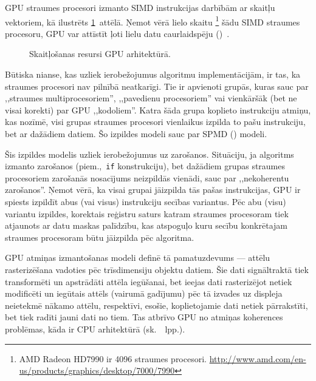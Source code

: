 GPU straumes procesori izmanto SIMD instrukcijas darbībām ar skaitļu
vektoriem, kā ilustrēts \ref{fig:gpu-arch}~attēlā. Ņemot vērā lielo skaitu%
\footnote{AMD Radeon HD7990 ir 4096 straumes procesori.
	\url{http://www.amd.com/en-us/products/graphics/desktop/7000/7990}}
šādu SIMD straumes procesoru, GPU var attīstīt ļoti lielu datu caurlaidspēju
()~\cite{Fatahalian}\cite{Owens-GPU}.

\begin{figure}[tbh]
	\centering
	\def\svgscale{1.2}
	{}
	\caption{Skaitļošanas resursi GPU arhitektūrā.}
	\label{fig:gpu-arch}
\end{figure}

Būtiska nianse, kas uzliek ierobežojumus algoritmu implementācijām, ir tas,
ka straumes procesori nav pilnībā neatkarīgi. Tie ir apvienoti grupās, kuras
sauc par ,,straumes multiprocesoriem'', ,,pavedienu procesoriem'' vai
vienkāršāk (bet ne visai korekti) par GPU ,,kodoliem''. Katra šāda grupa
koplieto instrukciju atmiņu, kas nozīmē, visi grupas straumes
procesori vienlaikus izpilda to pašu instrukciju, bet ar dažādiem datiem.
Šo izpildes modeli sauc par SPMD ()
modeli.

Šis izpildes modelis uzliek ierobežojumus uz zarošanos.
Situāciju, ja algoritms izmanto
zarošanos (piem.,~\texttt{if} konstrukciju),
bet dažādiem grupas straumes procesoriem zarošanās nosacījums neizpildās
vienādi, sauc par ,,nekoherentu zarošanos''. Ņemot vērā, ka visai grupai
jāizpilda tās pašas instrukcijas, GPU ir spiests izpildīt
abus (vai visus) instrukciju secības variantus. Pēc abu (visu) variantu
izpildes, korektais reģistru saturs katram straumes procesoram tiek
atjaunots ar datu maskas palīdzību, kas atspoguļo kuru secību
konkrētajam straumes procesoram būtu jāizpilda pēc algoritma.
\cite{Owens-GPU}



GPU atmiņas izmantošanas modeli definē tā pamatuzdevums --- 
attēlu rasterizēšana vadoties pēc trīsdimensiju objektu datiem.
Šie dati signāltraktā tiek transformēti un apstrādāti attēla iegūšanai,
bet ieejas dati rasterizējot netiek modificēti
un iegūtais attēls (vairumā gadījumu) pēc tā izvades uz displeja neietekmē
nākamo attēlu, respektīvi, esošie, koplietojamie dati netiek pārrakstīti,
bet tiek radīti jauni dati no tiem. Tas atbrīvo GPU no atmiņas koherences
problēmas, kāda ir CPU arhitektūrā (sk.~\pageref{sec:cache}~lpp.).

